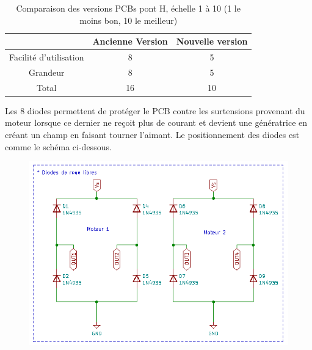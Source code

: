 \documentclass[
	a4paper,									%
	11pt,										%
	twoside,									%
	openright,									%
	notitlepage,									%
	parskip=half,								%
]{scrreprt}										%
\begin{document}
\begin{table}[!ht]
    \begin{center}
        \vspace{5mm}
        \label{tab:table6}
        \begin{tabular}{c|c|c} %
            \toprule
            \textbf{ } & \textbf{Ancienne Version} & \textbf{Nouvelle version}\\
            \midrule
            Facilité d'utilisation & 8 & 5\\
            Grandeur & 8 & 5\\
			\midrule
			Total & 16 & 10\\
            \bottomrule
        \end{tabular}
    \end{center}    
	\caption{Comparaison des versions PCBs pont H, échelle 1 à 10 (1 le moins bon, 10 le meilleur)}
\end{table}

Les 8 diodes permettent de protéger le PCB contre les surtensions provenant du moteur lorsque ce dernier ne reçoit 
plus de courant et devient une génératrice en créant un champ en faisant tourner l'aimant. Le positionnement des 
diodes est comme le schéma ci-dessous. 

\begin{figure}[!h]
	\begin{center}
		\includegraphics[scale=.7]{img/Diodes.png}
		\label{Diodes}
	\end{center}
\end{figure}
\end{document}

